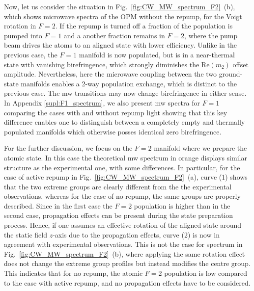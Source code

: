 \documentclass[%
reprint,
 amsmath,amssymb,
 aps,
floatfix,
]{revtex4-1}
\begin{document}
Now, let us consider the situation in Fig.~\ref{fig:CW_MW_spectrum_F2}~(b), which shows microwave spectra of the OPM without the repump, for the Voigt rotation in $F=2$. 
If the repump is turned off a fraction of the population is  pumped into $F=1$ and a another fraction remains in $F=2$, where the pump beam drives the atoms to an aligned state with lower efficiency.
Unlike in the previous case, the $F=1$ manifold is now populated, but is in a near-thermal state with vanishing birefringence, which strongly diminishes the $\mathrm{Re}(m_2)$ offset amplitude. Nevertheless, here the microwave coupling between the two ground-state manifolds enables a 2-way population exchange, which is distinct to the previous case. The mw transitions may now change birefringence in either sense.
In Appendix \ref{supl:F1_spectrum}, we also present mw spectra for $F=1$ comparing the cases with and without repump light showing that this key difference enables one to distinguish between a completely empty and thermally populated manifolds which otherwise posses identical zero birefringence.

For the further discussion, we focus on the $F=2$ manifold where we prepare the atomic state. In this case the theoretical mw spectrum in orange displays similar structure as the experimental one, with some differences. In particular, for the case of active  repump in Fig.~\ref{fig:CW_MW_spectrum_F2}~(a), curve (1) shows that the two extreme groups are clearly different from the the experimental observations, whereas for the case of no repump, the same groups are properly described. Since in the first case the $F=2$ population is higher than in the second case, propagation effects can be present during the state preparation process. Hence, if one assumes an effective rotation of the aligned state around the static field $z$-axis due to the propagation effects, curve (2) is now in agreement with experimental observations. This is not the case for spectrum in Fig.~\ref{fig:CW_MW_spectrum_F2}~(b), where applying the same rotation effect does not change the extreme group profiles but instead modifies the centre group. This indicates that for no repump, the atomic $F=2$ population is low compared to the case with active repump, and no propagation effects have to be considered.
\end{document}
